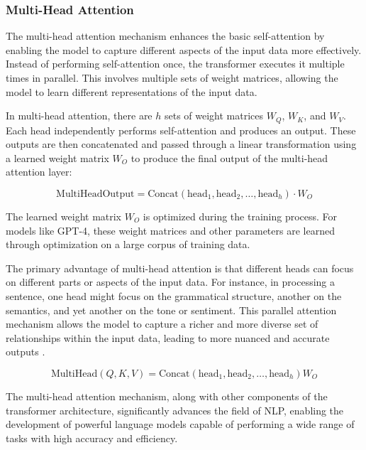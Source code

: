 \subsubsection{Multi-Head Attention}

The multi-head attention mechanism enhances the basic self-attention by enabling the model to capture different aspects of the input data more effectively. Instead of performing self-attention once, the transformer executes it multiple times in parallel. This involves multiple sets of weight matrices, allowing the model to learn different representations of the input data.

In multi-head attention, there are \( h \) sets of weight matrices \( W_Q \), \( W_K \), and \( W_V \). Each head independently performs self-attention and produces an output. These outputs are then concatenated and passed through a linear transformation using a learned weight matrix \( W_O \) to produce the final output of the multi-head attention layer:

\begin{equation}
    \text{MultiHeadOutput} = \text{Concat}(\text{head}_1, \text{head}_2, \ldots, \text{head}_h) \cdot W_O
\end{equation}

The learned weight matrix \( W_O \) is optimized during the training process. For models like GPT-4, these weight matrices and other parameters are learned through optimization on a large corpus of training data.

The primary advantage of multi-head attention is that different heads can focus on different parts or aspects of the input data. For instance, in processing a sentence, one head might focus on the grammatical structure, another on the semantics, and yet another on the tone or sentiment. This parallel attention mechanism allows the model to capture a richer and more diverse set of relationships within the input data, leading to more nuanced and accurate outputs \cite{geeksforgeeks2024-sa}.

\begin{equation}
    \text{MultiHead}(Q, K, V) = \text{Concat}(\text{head}_1, \text{head}_2, \ldots, \text{head}_h)W_O
\end{equation}

The multi-head attention mechanism, along with other components of the transformer architecture, significantly advances the field of NLP, enabling the development of powerful language models capable of performing a wide range of tasks with high accuracy and efficiency.


